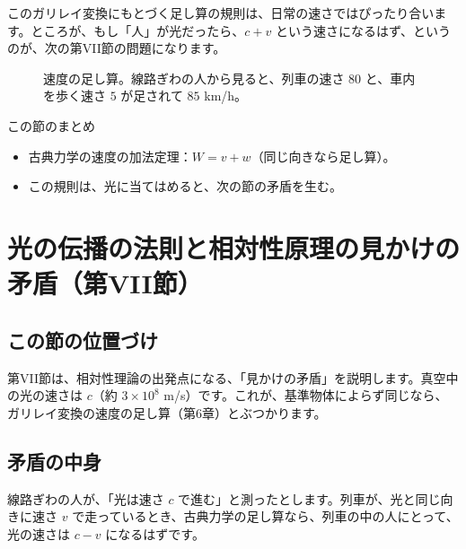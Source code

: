 \documentclass[a4paper,11pt,openany]{ltjsbook}
\begin{document}
このガリレイ変換にもとづく足し算の規則は、日常の速さではぴったり合います。ところが、もし「人」が光だったら、$c+v$ という速さになるはず、というのが、次の第VII節の問題になります。

\begin{figure}[htbp]
\centering
{}
\caption{速度の足し算。線路ぎわの人から見ると、列車の速さ $80$ と、車内を歩く速さ $5$ が足されて $85$ km/h。}
\end{figure}

\begin{pointbox}{この節のまとめ}
\begin{itemize}[leftmargin=*]
\item 古典力学の速度の加法定理：$W=v+w$（同じ向きなら足し算）。
\item この規則は、光に当てはめると、次の節の矛盾を生む。
\end{itemize}
\end{pointbox}

\chapter{光の伝播の法則と相対性原理の見かけの矛盾（第VII節）}

\section{この節の位置づけ}

第VII節は、相対性理論の出発点になる、「見かけの矛盾」を説明します。真空中の光の速さは $c$（約 $3\times10^{8}$ m/s）です。これが、基準物体によらず同じなら、ガリレイ変換の速度の足し算（第6章）とぶつかります。

\section{矛盾の中身}

線路ぎわの人が、「光は速さ $c$ で進む」と測ったとします。列車が、光と同じ向きに速さ $v$ で走っているとき、古典力学の足し算なら、列車の中の人にとって、光の速さは $c-v$ になるはずです。
\end{document}
